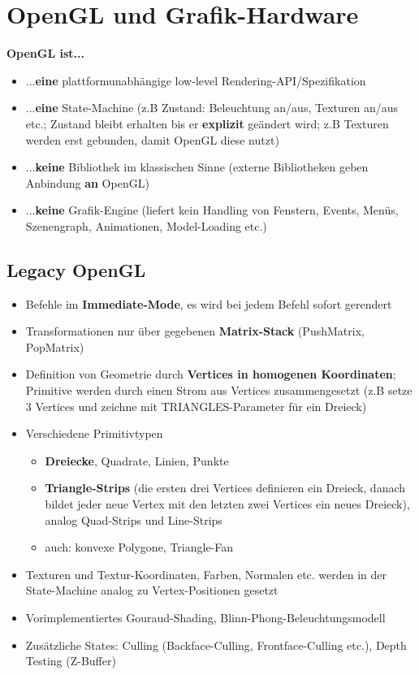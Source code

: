 \section{OpenGL und Grafik-Hardware}%
\label{gl:sec:opengl_und_grafik_hardware}

\textbf{OpenGL ist...}
\begin{itemize}
	\item ...\textbf{eine} plattformunabhängige low-level Rendering-API/Spezifikation
	\item ...\textbf{eine} State-Machine (z.B Zustand: Beleuchtung an/aus, Texturen an/aus etc.; Zustand bleibt erhalten bis er \textbf{explizit} geändert wird; z.B Texturen werden erst \glqq gebunden\grqq, damit OpenGL diese nutzt)
	\item ...\textbf{keine} Bibliothek im klassischen Sinne (externe Bibliotheken geben Anbindung \textbf{an} OpenGL)
	\item ...\textbf{keine} Grafik-Engine (liefert kein Handling von Fenstern, Events, Menüs, Szenengraph, Animationen, Model-Loading etc.)
\end{itemize}

\subsection{Legacy OpenGL}%
\label{gl:sub:legacy_opengl}

\begin{itemize}
	\item Befehle im \textbf{Immediate-Mode}, es wird bei jedem Befehl sofort gerendert
	\item Transformationen nur über gegebenen \textbf{Matrix-Stack} (PushMatrix, PopMatrix)
	\item Definition von Geometrie durch \textbf{Vertices in homogenen Koordinaten}; Primitive werden durch einen Strom aus Vertices zusammengesetzt (z.B setze 3 Vertices und zeichne mit TRIANGLES-Parameter für ein Dreieck)
	\item Verschiedene Primitivtypen
	\begin{itemize}
		\item \textbf{Dreiecke}, Quadrate, Linien, Punkte
		\item \textbf{Triangle-Strips} (die ersten drei Vertices definieren ein Dreieck, danach bildet jeder neue Vertex mit den letzten zwei Vertices ein neues Dreieck), analog Quad-Strips und Line-Strips
		\item auch: konvexe Polygone, Triangle-Fan
	\end{itemize}
	\item Texturen und Textur-Koordinaten, Farben, Normalen etc. werden in der State-Machine analog zu Vertex-Positionen gesetzt
	\item Vorimplementiertes Gouraud-Shading, Blinn-Phong-Beleuchtungsmodell
	\item Zusätzliche States: Culling (Backface-Culling, Frontface-Culling etc.), Depth Testing (Z-Buffer)
\end{itemize}


